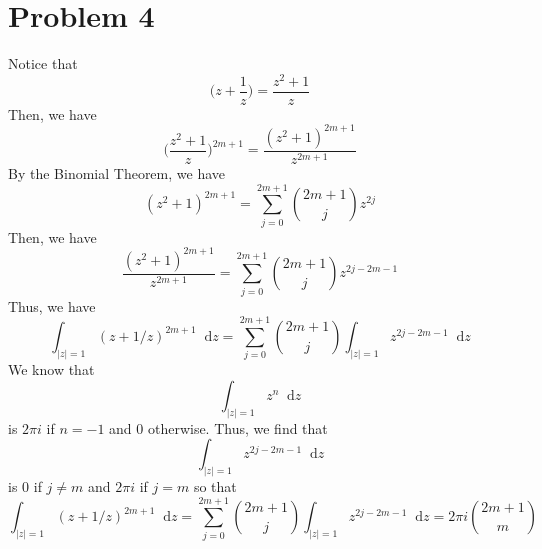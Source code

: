 \documentclass[12pt]{article}
\newcommand*\diff{\mathop{}\!\mathrm{d}}
\begin{document}
\newpage
\section*{Problem 4}
Notice that
\[
\bigg(z+\frac{1}{z}\bigg) = \frac{z^2+1}{z}
\] Then, we have
\[
\bigg(\frac{z^2+1}{z}\bigg)^{2m+1} = \frac{(z^2+1)^{2m+1}}{z^{2m+1}}
\] By the Binomial Theorem, we have
\[
(z^2+1)^{2m+1} = \sum_{j=0}^{2m+1} \binom{2m+1}{j} z^{2j}
\] Then, we have
\[
\frac{(z^2+1)^{2m+1}}{z^{2m+1}} = \sum_{j=0}^{2m+1} \binom{2m+1}{j} z^{2j-2m-1}
\] Thus, we have
\[
\int_{\vert z \vert = 1} (z+1/z)^{2m+1} \diff z = \sum_{j=0}^{2m+1}  \binom{2m+1}{j} \int_{\vert z \vert = 1} z^{2j-2m-1} \diff z
\] We know that
\[
\int_{\vert z \vert = 1} z^n \diff z 
\] is $2\pi i$ if $n = -1$ and $0$ otherwise. Thus, we find that
\[
\int_{\vert z \vert = 1} z^{2j-2m-1} \diff z
\] is $0$ if $j \neq m$ and $2\pi i$ if $j = m$ so that
\[
\int_{\vert z \vert = 1} (z+1/z)^{2m+1} \diff z = \sum_{j=0}^{2m+1}  \binom{2m+1}{j} \int_{\vert z \vert = 1} z^{2j-2m-1} \diff z = 2\pi i \binom{2m+1}{m}
\]
\end{document}
